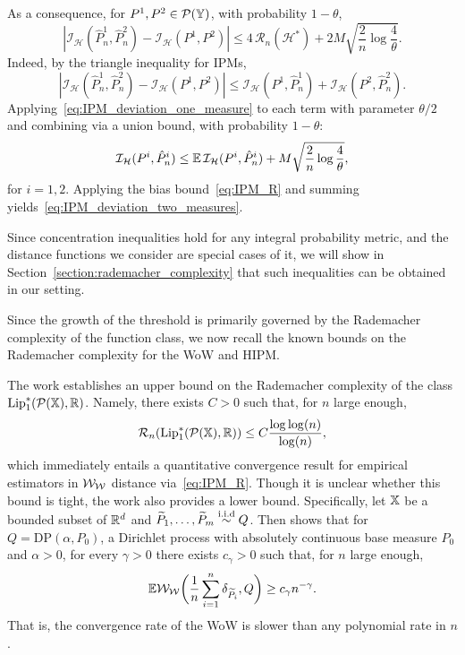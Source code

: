 As a consequence, for $P^1, P^2 \in \mathcal{P}(\mathbb{Y})$, with probability $1-\theta$,
\begin{equation}
\label{eq:IPM_deviation_two_measures}
|\mathcal{I}_{\mathcal{H}}(\hat{P}^1_n,\hat{P}^2_n) -  \mathcal{I}_{\mathcal{H}}(P^1, P^2)| \leq 4\,\mathcal{R}_n(\mathcal{H}^*) + 2M\sqrt{\frac{2}{n} \log \frac{4}{\theta}}.
\end{equation}
Indeed, by the triangle inequality for IPMs,
\[
|\mathcal{I}_{\mathcal{H}}(\hat{P}^1_n,\hat{P}^2_n) - \mathcal{I}_{\mathcal{H}}(P^1,P^2)| \leq \mathcal{I}_{\mathcal{H}}(P^1,\hat{P}^1_n) + \mathcal{I}_{\mathcal{H}}(P^2,\hat{P}^2_n).
\]
Applying~\eqref{eq:IPM_deviation_one_measure} to each term with parameter $\theta/2$ and combining via a union bound, with probability $1-\theta$:
\[
\mathcal{I}_{\mathcal{H}}(P^i,\hat{P}^i_n) \leq \mathbb{E}\,\mathcal{I}_{\mathcal{H}}(P^i,\hat{P}^i_n) + M\sqrt{\frac{2}{n}\log\frac{4}{\theta}},
\]
for $i = 1,2.$ Applying the bias bound~\eqref{eq:IPM_R} and summing yields~\eqref{eq:IPM_deviation_two_measures}.

Since concentration inequalities hold for any integral probability metric, and the distance functions we consider are special cases of it, we will show in Section~\ref{section:rademacher_complexity} that such inequalities can be obtained in our setting. 

Since the growth of the threshold is primarily governed by the Rademacher complexity of the function class, we now recall the known bounds on the Rademacher complexity for the WoW and HIPM.


The work \cite{catalano2024hierarchical} establishes an upper bound on the Rademacher complexity of the class $\mathrm{Lip}_1^*(\mathcal{P}(\mathbb{X}),\mathbb{R})$. Namely, there exists $C>0$ such that, for $n$ large enough,
\begin{equation}
\label{equation:rademacher_wow}
\mathcal{R}_n(\mathrm{Lip}_1^*(\mathcal{P}(\mathbb{X}), \mathbb{R})) \le C \frac{\log \log (n)}{\log(n)},
\end{equation}
which immediately entails a quantitative convergence result for empirical estimators in $\mathcal{W}_{\mathcal{W}}$ distance via~\eqref{eq:IPM_R}. Though it is unclear whether this bound is tight, the work \cite{catalano2024hierarchical} also provides a lower bound.
Specifically, let $\mathbb{X}$ be a bounded subset of $\mathbb{R}^d$ and $\widetilde{P}_1, \dots, \widetilde{P}_m \overset{\mathrm{i.i.d}}{\sim} Q$. Then \citet[Theorem 4.1]{catalano2024hierarchical} shows that for $Q = \mathrm{DP}(\alpha,P_0)$, a Dirichlet process with absolutely continuous base measure $P_0$ and $\alpha > 0$, for every $\gamma>0$ there exists $c_\gamma>0$ such that, for $n$ large enough,
\[
\mathbb{E} \mathcal{W}_{\mathcal{W}} \bigg(\frac{1}{n} \sum_{i=1}^n \delta_{\widetilde{P}_i}, Q \bigg) \ge c_{\gamma} n^{-\gamma}.
\]
That is, the convergence rate of the WoW is slower than any polynomial rate in $n$.

